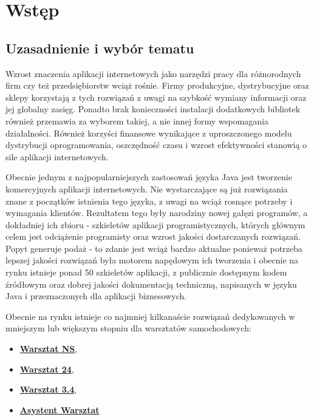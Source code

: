 \chapter{Wstęp}
\label{chaper:introduction}

\section{Uzasadnienie i wybór tematu}
	
	Wzrost znaczenia aplikacji internetowych jako narzędzi pracy dla różnorodnych firm czy też przedsiębiorstw wciąż rośnie. Firmy produkcyjne, dystrybucyjne oraz sklepy korzystają z tych rozwiązań z uwagi na szybkość wymiany informacji oraz jej globalny zasięg. Ponadto brak konieczności instalacji dodatkowych bibliotek również przemawia za wyborem takiej, a nie innej formy wspomagania działalności. Również korzyści finansowe wynikające z uproszczonego modelu dystrybucji oprogramowania, oszczędność czasu i wzrost efektywności stanowią o sile aplikacji internetowych.
	
	Obecnie jednym z najpopularniejszych zastosowań języka Java jest tworzenie komercyjnych aplikacji internetowych. Nie wystarczające są już rozwiązania znane z początków istnienia tego języka, z uwagi na wciąż rosnące potrzeby i wymagania klientów. Rezultatem tego były narodziny nowej gałęzi programów, a dokładniej ich zbioru - szkieletów aplikacji programistycznych, których głównym celem jest odciążenie programisty oraz wzrost jakości dostarczanych rozwiązań. Popyt generuje podaż - to zdanie jest wciąż bardzo aktualne ponieważ potrzeba lepszej jakości rozwiązań była motorem napędowym ich tworzenia i obecnie na rynku istnieje ponad 50 szkieletów aplikacji, z publicznie dostępnym kodem źródłowym oraz dobrej jakości dokumentacją techniczną, napisanych w języku Java i przeznaczonych dla aplikacji biznesowych. 
	
	Obecnie na rynku istnieje co najmniej kilkanaście rozwiązań dedykowanych w mniejszym lub większym stopniu dla warsztatów samochodowych:
	\begin{itemize}
		\item \href{http://www.netsystem.info.pl/produkt/20}{\textbf{Warsztat NS}},
		\item \href{http://www.warsztat24.com/warsztat24-funkcjonalnosci}{\textbf{Warsztat 24}},
		\item \href{http://www.algorytm.pl/}{\textbf{Warsztat 3.4}},
		\item \href{http://meteoryt.pl/Asystent_Warsztat-k240.html}{\textbf{Asystent Warsztat}}
	\end{itemize}		
	
